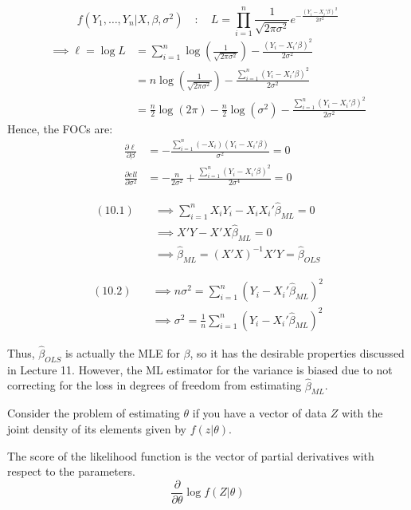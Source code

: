 \documentclass[DIV=14,titlepage=false]{scrreprt}
\begin{document}
\begin{example}
    \[
      f(Y_1,\dots, Y_n|X,\beta,\sigma^2) \quad : \quad L = \prod_{i=1}^{n}\frac{1}{\sqrt{2 \pi \sigma^2}}e^{-\frac{(Y_i-X_i'\beta)^2}{2\sigma^2}}  
    \]
    \begin{align*}
    \implies \ell = \log L &=\sum_{i=1}^{n}\log\left(\frac{1}{\sqrt{2 \pi \sigma^2}}\right) -\frac{(Y_i-X_i'\beta)^2}{2\sigma^2}\\
    &= n \log\left(\frac{1}{\sqrt{2 \pi \sigma^2}}\right) - \frac{\sum_{i=1}^{n}(Y_i-X_i'\beta)^2}{2\sigma^2}\\
    &= \frac{n}{2}\log(2\pi) - \frac{n}{2}\log(\sigma^2) - \frac{\sum_{i=1}^{n}(Y_i-X_i'\beta)^2}{2\sigma^2}
    \end{align*}
Hence, the FOCs are:
\begin{align}
    \frac{\partial \ell}{\partial \beta} &= - \frac{\sum_{i=1}^{n}(-X_i)(Y_i-X_i'\beta)}{\sigma^2}=0\\
    \frac{\partial ell}{\partial \sigma^2} &= -\frac{n}{2\sigma^2 } + \frac{\sum_{i=1}^{n}(Y_i-X_i'\beta)^2}{2\sigma^4}=0
\end{align}
\begin{minipage}{.5\textwidth}
\begin{align*}
    (10.1) \quad& \implies \sum_{i=1}^{n}X_iY_i-X_iX_i'\hat\beta_{ML}=0\\
    & \implies X'Y -X'X\hat\beta_{ML}=0\\
    & \implies\hat\beta_{ML} = (X'X)^{-1}X'Y = \hat\beta_{OLS}
\end{align*}
\end{minipage}
\begin{minipage}{.5\textwidth}
    \begin{align*}
        (10.2) \quad& \implies  n \sigma^2 = \sum_{i=1}^{n}(Y_i-X_i'\hat\beta_{ML})^2\\
        & \implies \sigma^2 = \frac{1}{n}\sum_{i=1}^{n}(Y_i-X_i'\hat\beta_{ML})^2
    \end{align*}
\end{minipage}
Thus, $\hat\beta_{OLS}$ is actually the MLE for $\beta$, so it has the desirable properties discussed in Lecture 11. However, the ML estimator for the variance is biased due to not correcting for the loss in degrees of freedom from estimating $\hat\beta_{ML}$.
\end{example}

Consider the problem of estimating $\theta$ if you have a vector of data $Z$ with the joint density of its elements given by $f(z|\theta)$.
\begin{definition}[Score]
    The score of the likelihood function is the vector of partial derivatives with respect to the parameters. 
    \[\frac{\partial}{\partial \theta} \log f(Z|\theta) \]
\end{definition}
\end{document}
